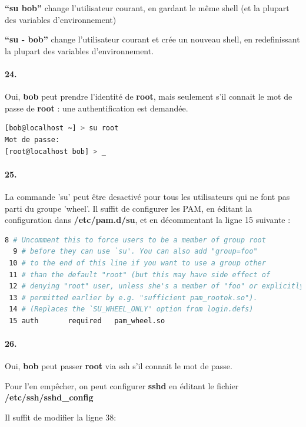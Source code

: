 \documentclass[10pt]{article}
\begin{document}
    \textbf{``su bob''} change l'utilisateur courant, en gardant le même shell (et la plupart des variables d'environnement)
    
    \textbf{``su - bob''} change l'utilisateur courant et crée un nouveau shell, en redefinissant la plupart des variables d'environnement.
    
     \paragraph{24.} Oui, \textbf{bob} peut prendre l'identité de \textbf{root}, mais seulement s'il connait
     le mot de passe de \textbf{root} : une authentification est demandée.
     
\begin{lstlisting}[language=bash]
[bob@localhost ~] > su root
Mot de passe:
[root@localhost bob] > _
\end{lstlisting}
    
    \paragraph{25.} La commande 'su' peut être desactivé pour tous les utilisateurs qui ne font pas parti du groupe 'wheel'. Il suffit de configurer les PAM, en éditant la configuration dans \textbf{/etc/pam.d/su}, et en décommentant la ligne 15 suivante :
    
\begin{lstlisting}[language=bash]
  8 # Uncomment this to force users to be a member of group root
  9 # before they can use `su'. You can also add "group=foo"
 10 # to the end of this line if you want to use a group other
 11 # than the default "root" (but this may have side effect of
 12 # denying "root" user, unless she's a member of "foo" or explicitly
 13 # permitted earlier by e.g. "sufficient pam_rootok.so").
 14 # (Replaces the `SU_WHEEL_ONLY' option from login.defs)
 15 auth       required   pam_wheel.so
\end{lstlisting}

    \paragraph{26.} Oui, \textbf{bob} peut passer \textbf{root} via ssh s'il connait le mot de passe.
    
    Pour l'en empêcher, on peut configurer \textbf{sshd} en éditant le fichier \textbf{/etc/ssh/sshd\_config}
    
    Il suffit de modifier la ligne 38:
    
\end{document}
